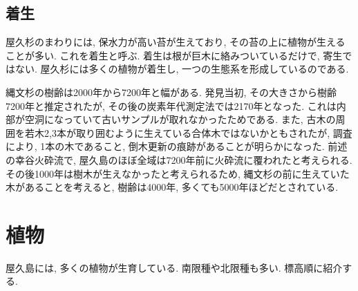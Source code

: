 \documentclass[10pt,titlepage,a5paper]{ltjsbook}
\begin{document}
  \subsection{着生}
    屋久杉のまわりには, 保水力が高い苔が生えており, その苔の上に植物が生えることが多い. これを着生と呼ぶ. 着生は根が巨木に絡みついているだけで, 寄生ではない. 屋久杉には多くの植物が着生し, 一つの生態系を形成しているのである.
  \vspace{1em}
  \begin{tcolorbox}[title=コラム:縄文杉は何歳?,width=\textwidth]
    縄文杉の樹齢は2000年から7200年と幅がある. 発見当初, その大きさから樹齢7200年と推定されたが, その後の炭素年代測定法では2170年となった. これは内部が空洞になっていて古いサンプルが取れなかったためである.
    また, 古木の周囲を若木2,3本が取り囲むように生えている合体木ではないかともされたが, 調査により, 1本の木であること, 倒木更新の痕跡があることが明らかになった. 前述の幸谷火砕流で, 屋久島のほぼ全域は7200年前に火砕流に覆われたと考えられる. その後1000年は樹木が生えなかったと考えられるため, 縄文杉の前に生えていた木があることを考えると, 樹齢は4000年, 多くても5000年ほどだとされている.
  \end{tcolorbox}
\section{植物}
  屋久島には, 多くの植物が生育している. 南限種や北限種も多い. 標高順に紹介する.
\end{document}
